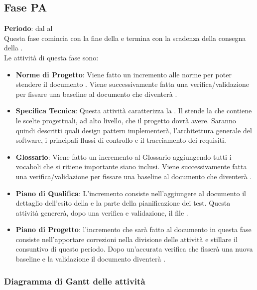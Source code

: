 \subsection{Fase PA}
	\textbf{Periodo}: dal  al  \\Questa fase comincia con la fine della  e termina con la scadenza della consegna della . \\Le attività di questa fase sono:
	\begin{itemize}
		\item \textbf{Norme di Progetto}: Viene fatto un incremento alle norme per poter stendere il documento . Viene successivamente fatta una verifica/validazione per fissare una baseline al documento che diventerà .
		\item \textbf{Specifica Tecnica}: Questa attività caratterizza la . Il  stende la  che contiene le scelte progettuali, ad alto livello, che il progetto dovrà avere. Saranno quindi descritti quali design pattern \projectname implementerà, l'architettura generale del software, i principali flussi di controllo e il tracciamento dei requisiti.
		\item \textbf{Glossario}: Viene fatto un incremento al Glossario aggiungendo tutti i vocaboli che si ritiene importante siano inclusi. Viene successivamente fatta una verifica/validazione per fissare una baseline al documento che diventerà .
		\item \textbf{Piano di Qualifica}: L'incremento consiste nell'aggiungere al documento  il dettaglio dell'esito della  e la parte della pianificazione dei test. Questa attività genererà, dopo una verifica e validazione, il file .
		\item \textbf{Piano di Progetto}: l'incremento che sarà fatto al documento  in questa fase consiste nell'apportare correzioni nella divisione delle attività e stillare il consuntivo di questo periodo. Dopo un'accurata verifica che fisserà una nuova baseline e la validazione il documento diventerà .
	\end{itemize}
	\subsubsection{Diagramma di Gantt delle attività}
